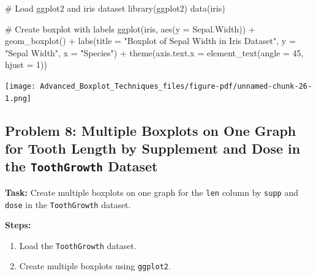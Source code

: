 \documentclass[
  letterpaper,
  DIV=11,
  numbers=noendperiod]{scrreprt}
\newenvironment{Shaded}{\begin{snugshade}}{\end{snugshade}}
\newcommand{\AttributeTok}[1]{\textcolor[rgb]{0.40,0.45,0.13}{#1}}
\newcommand{\CommentTok}[1]{\textcolor[rgb]{0.37,0.37,0.37}{#1}}
\newcommand{\DecValTok}[1]{\textcolor[rgb]{0.68,0.00,0.00}{#1}}
\newcommand{\FunctionTok}[1]{\textcolor[rgb]{0.28,0.35,0.67}{#1}}
\newcommand{\NormalTok}[1]{\textcolor[rgb]{0.00,0.23,0.31}{#1}}
\newcommand{\SpecialCharTok}[1]{\textcolor[rgb]{0.37,0.37,0.37}{#1}}
\newcommand{\StringTok}[1]{\textcolor[rgb]{0.13,0.47,0.30}{#1}}
\providecommand{\tightlist}{%
  \setlength{\itemsep}{0pt}\setlength{\parskip}{0pt}}\usepackage{longtable,booktabs,array}
\begin{document}
\begin{Shaded}
\begin{Highlighting}[]
\CommentTok{\# Load ggplot2 and iris dataset}
\FunctionTok{library}\NormalTok{(ggplot2)}
\FunctionTok{data}\NormalTok{(iris)}

\CommentTok{\# Create boxplot with labels}
\FunctionTok{ggplot}\NormalTok{(iris, }\FunctionTok{aes}\NormalTok{(}\AttributeTok{y =}\NormalTok{ Sepal.Width)) }\SpecialCharTok{+}
  \FunctionTok{geom\_boxplot}\NormalTok{() }\SpecialCharTok{+}
  \FunctionTok{labs}\NormalTok{(}\AttributeTok{title =} \StringTok{"Boxplot of Sepal Width in Iris Dataset"}\NormalTok{, }\AttributeTok{y =} \StringTok{"Sepal Width"}\NormalTok{, }\AttributeTok{x =} \StringTok{"Species"}\NormalTok{) }\SpecialCharTok{+}
  \FunctionTok{theme}\NormalTok{(}\AttributeTok{axis.text.x =} \FunctionTok{element\_text}\NormalTok{(}\AttributeTok{angle =} \DecValTok{45}\NormalTok{, }\AttributeTok{hjust =} \DecValTok{1}\NormalTok{))}
\end{Highlighting}
\end{Shaded}

\texttt{[image: Advanced\_Boxplot\_Techniques\_files/figure-pdf/unnamed-chunk-26-1.png]}

\subsection*{\texorpdfstring{Problem 8: Multiple Boxplots on One Graph
for Tooth Length by Supplement and Dose in the \texttt{ToothGrowth}
Dataset}{Problem 8: Multiple Boxplots on One Graph for Tooth Length by Supplement and Dose in the ToothGrowth Dataset}}\label{problem-8-multiple-boxplots-on-one-graph-for-tooth-length-by-supplement-and-dose-in-the-toothgrowth-dataset}

\textbf{Task:} Create multiple boxplots on one graph for the
\texttt{len} column by \texttt{supp} and \texttt{dose} in the
\texttt{ToothGrowth} dataset.

\textbf{Steps:}

\begin{enumerate}
\def\labelenumi{\arabic{enumi}.}
\tightlist
\item
  Load the \texttt{ToothGrowth} dataset.
\item
  Create multiple boxplots using \texttt{ggplot2}.
\end{enumerate}
\end{document}

